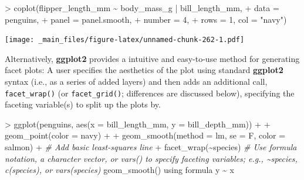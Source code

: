 \documentclass[
]{book}
\newenvironment{Shaded}{\begin{snugshade}}{\end{snugshade}}
\newcommand{\AttributeTok}[1]{\textcolor[rgb]{0.77,0.63,0.00}{#1}}
\newcommand{\CommentTok}[1]{\textcolor[rgb]{0.56,0.35,0.01}{\textit{#1}}}
\newcommand{\DecValTok}[1]{\textcolor[rgb]{0.00,0.00,0.81}{#1}}
\newcommand{\FunctionTok}[1]{\textcolor[rgb]{0.00,0.00,0.00}{#1}}
\newcommand{\NormalTok}[1]{#1}
\newcommand{\SpecialCharTok}[1]{\textcolor[rgb]{0.00,0.00,0.00}{#1}}
\newcommand{\StringTok}[1]{\textcolor[rgb]{0.31,0.60,0.02}{#1}}
\begin{document}
\begin{Shaded}
\begin{Highlighting}[]
\SpecialCharTok{\textgreater{}} \FunctionTok{coplot}\NormalTok{(flipper\_length\_mm }\SpecialCharTok{\textasciitilde{}}\NormalTok{ body\_mass\_g }\SpecialCharTok{|}\NormalTok{ bill\_length\_mm, }
\SpecialCharTok{+}        \AttributeTok{data =}\NormalTok{ penguins,}
\SpecialCharTok{+}        \AttributeTok{panel =}\NormalTok{ panel.smooth,}
\SpecialCharTok{+}        \AttributeTok{number =} \DecValTok{4}\NormalTok{, }
\SpecialCharTok{+}        \AttributeTok{rows =} \DecValTok{1}\NormalTok{, }\AttributeTok{col =} \StringTok{"navy"}\NormalTok{)}
\end{Highlighting}
\end{Shaded}

\texttt{[image: \_main\_files/figure-latex/unnamed-chunk-262-1.pdf]}

Alternatively, \textbf{ggplot2} provides a intuitive and easy-to-use method for generating facet plots: A user specifies the aesthetics of the plot using standard \textbf{ggplot2} syntax (i.e., as a series of added layers) and then adds an additional call, \texttt{facet\_wrap()} (or \texttt{facet\_grid()}; differences are discussed below), specifying the faceting variable(s) to split up the plots by.

\begin{Shaded}
\begin{Highlighting}[]
\SpecialCharTok{\textgreater{}} \FunctionTok{ggplot}\NormalTok{(penguins, }\FunctionTok{aes}\NormalTok{(}\AttributeTok{x =}\NormalTok{ bill\_length\_mm, }\AttributeTok{y =}\NormalTok{ bill\_depth\_mm)) }\SpecialCharTok{+}
\SpecialCharTok{+}   \FunctionTok{geom\_point}\NormalTok{(}\AttributeTok{color =} \StringTok{\textquotesingle{}navy\textquotesingle{}}\NormalTok{) }\SpecialCharTok{+}
\SpecialCharTok{+}   \FunctionTok{geom\_smooth}\NormalTok{(}\AttributeTok{method =} \StringTok{\textquotesingle{}lm\textquotesingle{}}\NormalTok{, }\AttributeTok{se =}\NormalTok{ F, }\AttributeTok{color =} \StringTok{\textquotesingle{}salmon\textquotesingle{}}\NormalTok{) }\SpecialCharTok{+} \CommentTok{\# Add basic least{-}squares line}
\SpecialCharTok{+}   \FunctionTok{facet\_wrap}\NormalTok{(}\SpecialCharTok{\textasciitilde{}}\NormalTok{species) }\CommentTok{\# Use formula notation, a character vector, or vars() to specify faceting variables; e.g., \textasciitilde{}species, c(\textquotesingle{}species\textquotesingle{}), or vars(species)}
\StringTok{\textasciigrave{}}\AttributeTok{geom\_smooth()}\StringTok{\textasciigrave{}}\NormalTok{ using formula }\StringTok{\textquotesingle{}y \textasciitilde{} x\textquotesingle{}}
\end{Highlighting}
\end{Shaded}
\end{document}
